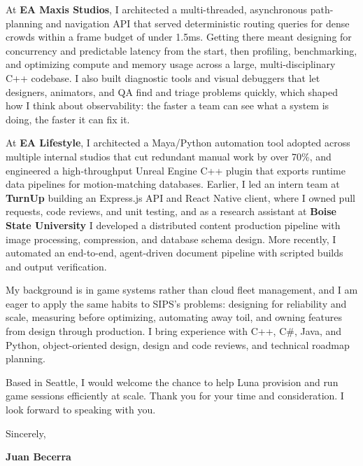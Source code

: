 \documentclass[letterpaper,11pt]{article}
\begin{document}
At \textbf{EA Maxis Studios}, I architected a multi-threaded, asynchronous path-planning and navigation API that
served deterministic routing queries for dense crowds within a frame budget of under 1.5ms. Getting there
meant designing for concurrency and predictable latency from the start, then profiling, benchmarking, and
optimizing compute and memory usage across a large, multi-disciplinary C++ codebase. I also built diagnostic
tools and visual debuggers that let designers, animators, and QA find and triage problems quickly, which
shaped how I think about observability: the faster a team can see what a system is doing, the faster it
can fix it.

At \textbf{EA Lifestyle}, I architected a Maya/Python automation tool adopted across multiple internal studios
that cut redundant manual work by over 70\%, and engineered a high-throughput Unreal Engine C++ plugin that
exports runtime data pipelines for motion-matching databases. Earlier, I led an intern team at
\textbf{TurnUp} building an Express.js API and React Native client, where I owned pull requests, code reviews,
and unit testing, and as a research assistant at \textbf{Boise State University} I developed a distributed
content production pipeline with image processing, compression, and database schema design. More recently, I
automated an end-to-end, agent-driven document pipeline with scripted builds and output verification.

My background is in game systems rather than cloud fleet management, and I am eager to apply the same
habits to SIPS's problems: designing for reliability and scale, measuring before optimizing, automating
away toil, and owning features from design through production. I bring experience with C++, C\#, Java, and
Python, object-oriented design, design and code reviews, and technical roadmap planning.

Based in Seattle, I would welcome the chance to help Luna provision and run game sessions efficiently at
scale. Thank you for your time and consideration. I look forward to speaking with you.

\vspace{10pt}
\noindent Sincerely,

\vspace{14pt}
\noindent \textbf{Juan Becerra}
\end{document}
